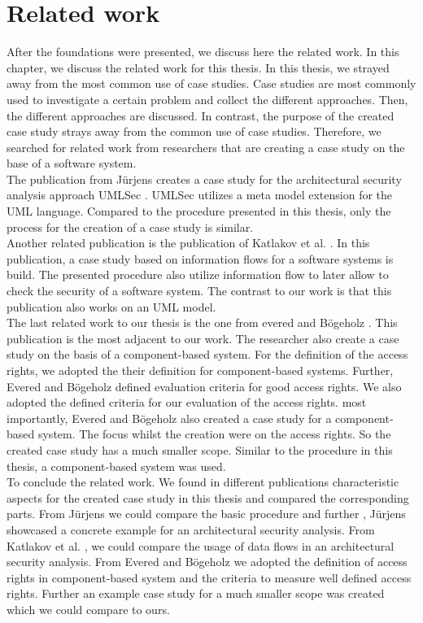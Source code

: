 \chapter{Related work}
\label{relWork}
After the foundations were presented, we discuss here the related work. In this chapter, we discuss the related work for this thesis. In this thesis, we strayed away from the most common use of case studies. Case studies are most commonly used to investigate a certain problem and collect the different approaches. Then, the different approaches are discussed. In contrast, the purpose of the created case study strays away from the common use of case studies. Therefore, we searched for related work from researchers that are creating a case study on the base of a software system. \\
The publication from Jürjens \cite{UMLSecCS} creates a case study for the architectural security analysis approach UMLSec \cite{UMLSec}. UMLSec utilizes a meta model extension for the UML language. Compared to the procedure presented in this thesis, only the process for the creation of a case study is similar.\\ Another related publication is the publication of Katlakov et al. \cite{Travelsystem}. In this publication, a case study based on information flows for a software systems is build. The presented procedure also utilize information flow to later allow to check the security of a software system. The contrast to our work is that this publication also works on an UML model.\\ The last related work to our thesis is the one from evered and Bögeholz \cite{CaseStudyAndAccessrigths}. This publication is the most adjacent to our work. The researcher also create a case study on the basis of a component-based system. For the definition of the access rights, we adopted the their definition for component-based systems. Further, Evered and Bögeholz defined evaluation criteria for good access rights. We also adopted the defined criteria for our evaluation of the access rights. most importantly, Evered and Bögeholz also created a case study for a component-based system. The focus whilst the creation were on the access rights. So the created case study has a much smaller scope.  Similar to the procedure in this thesis, a component-based system was used.\\
To conclude the related work. We found in different publications characteristic aspects for the created case study in this thesis and compared the corresponding parts. From Jürjens \cite{UMLSecCS} we could compare the basic procedure and further , Jürjens showcased a concrete example for an architectural security analysis. From Katlakov et al. \cite{Travelsystem}, we could compare the usage of data flows in an architectural security analysis. From Evered and Bögeholz \cite{CaseStudyAndAccessrigths} we adopted the definition of access rights in component-based system and the criteria to measure well defined access rights. Further an example case study for a much smaller scope was created which we could compare to ours.


